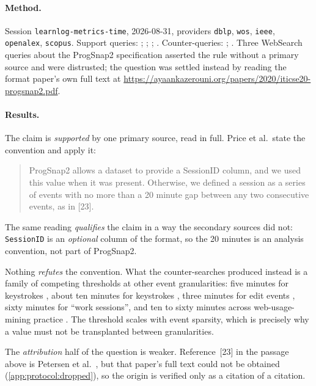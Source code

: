 \paragraph{Method.}
Session \texttt{learnlog-metrics-time}, 2026-08-31, providers \texttt{dblp},
\texttt{wos}, \texttt{ieee}, \texttt{openalex}, \texttt{scopus}.  Support
queries: ;
;
; .
Counter-queries: ;
.  Three WebSearch
queries about the ProgSnap2 specification asserted the rule without a
primary source and were distrusted; the question was settled instead by
reading the format paper's own full text at
\url{https://ayaankazerouni.org/papers/2020/iticse20-progsnap2.pdf}.

\paragraph{Results.}
The claim is \emph{supported} by one primary source, read in full.  Price et
al.\ state the convention and apply it:
\blockcquote[sec.~3.3.1]{price2020progsnap2}{ProgSnap2 allows a dataset to
provide a SessionID column, and we used this value when it was present.
Otherwise, we defined a session as a series of events with no more than a 20
minute gap between any two consecutive events, as in [23].}
The same reading \emph{qualifies} the claim in a way the secondary sources
did not: \texttt{SessionID} is an \emph{optional} column of the format, so
the 20 minutes is an analysis convention, not part of ProgSnap2.

Nothing \emph{refutes} the convention.  What the counter-searches produced
instead is a family of competing thresholds at other event granularities:
five minutes for keystrokes \autocite{hart2023accurate}, about ten minutes
for keystrokes \autocite{leinonen2021finegrained,leinonen2022timeontask},
three minutes for edit events \autocite{leinonen2017comparison}, sixty
minutes for \enquote{work sessions}, and ten to sixty minutes across
web-usage-mining practice \autocite{kovanovic2015penetrating}.  The
threshold scales with event sparsity, which is precisely why a value must
not be transplanted between granularities.

The \emph{attribution} half of the question is weaker.  Reference~[23] in
the passage above is Petersen et al.\ \autocite{petersen2015exploration},
but that paper's full text could not be obtained
(\cref{app:protocol:dropped}), so the origin is verified only as a citation
of a citation.

